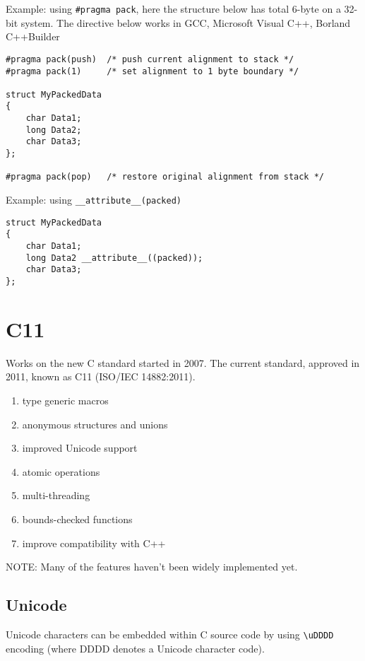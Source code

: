 Example: using \verb!#pragma pack!, here the structure below has total 6-byte on
a 32-bit system. The directive below works in GCC, Microsoft Visual C++, Borland
C++Builder
\begin{verbatim}
#pragma pack(push)  /* push current alignment to stack */
#pragma pack(1)     /* set alignment to 1 byte boundary */
 
struct MyPackedData
{
    char Data1;
    long Data2;
    char Data3;
};
 
#pragma pack(pop)   /* restore original alignment from stack */
\end{verbatim}

Example: using \verb!__attribute__(packed)! 
\begin{verbatim}
struct MyPackedData
{
    char Data1;
    long Data2 __attribute__((packed));
    char Data3;
};
\end{verbatim}
\section{C11}
\label{sec:C11-intro}


Works on the new C standard started in 2007. The current standard, approved in
2011, known as C11 (ISO/IEC 14882:2011). 
\begin{enumerate}
  \item type generic macros
  
  \item anonymous structures and unions
  
  \item improved Unicode support
  
  \item atomic operations
  
  \item multi-threading %
  
  \item bounds-checked functions
  
  \item improve compatibility with C++
\end{enumerate}
 
NOTE: Many of the features haven't been widely implemented yet.

\subsection{Unicode}
\label{sec:C11_unicode}

Unicode characters can be embedded within C source code by using \verb!\uDDDD!
encoding (where DDDD denotes a Unicode character code).
 
